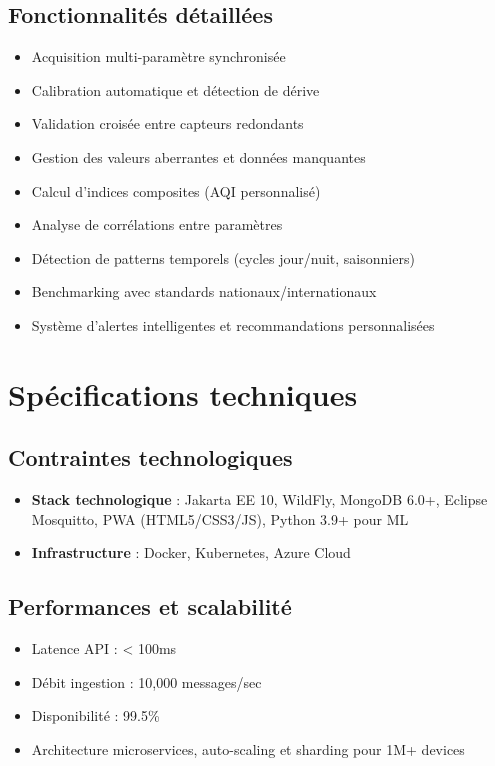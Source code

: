 \documentclass[12pt,a4paper]{article}
\begin{document}
\subsection{Fonctionnalités détaillées}
\begin{itemize}
    \item Acquisition multi-paramètre synchronisée
    \item Calibration automatique et détection de dérive
    \item Validation croisée entre capteurs redondants
    \item Gestion des valeurs aberrantes et données manquantes
    \item Calcul d'indices composites (AQI personnalisé)
    \item Analyse de corrélations entre paramètres
    \item Détection de patterns temporels (cycles jour/nuit, saisonniers)
    \item Benchmarking avec standards nationaux/internationaux
    \item Système d'alertes intelligentes et recommandations personnalisées
\end{itemize}

\section{Spécifications techniques}
\subsection{Contraintes technologiques}
\begin{itemize}
    \item \textbf{Stack technologique} : Jakarta EE 10, WildFly, MongoDB 6.0+, Eclipse Mosquitto, PWA (HTML5/CSS3/JS), Python 3.9+ pour ML
    \item \textbf{Infrastructure} : Docker, Kubernetes, Azure Cloud
\end{itemize}

\subsection{Performances et scalabilité}
\begin{itemize}
    \item Latence API : < 100ms
    \item Débit ingestion : 10,000 messages/sec
    \item Disponibilité : 99.5\%
    \item Architecture microservices, auto-scaling et sharding pour 1M+ devices
\end{itemize}
\end{document}
